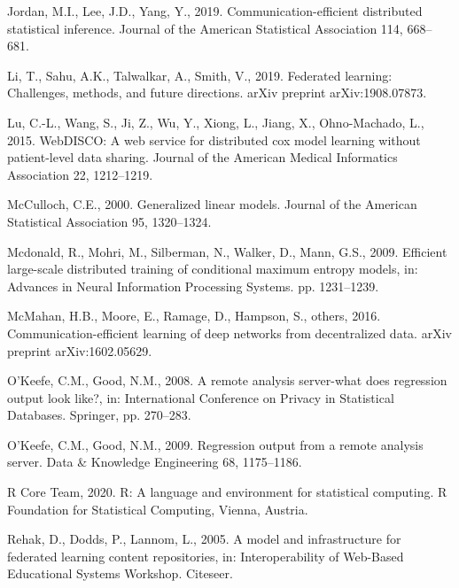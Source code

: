 \documentclass[]{elsarticle} %
\newlength{\cslhangindent}
\newenvironment{cslreferences}%
  {\setlength{\parindent}{0pt}%
  \everypar{\setlength{\hangindent}{\cslhangindent}}\ignorespaces}%
  {\par}
\begin{document}
\begin{cslreferences}
\leavevmode\hypertarget{ref-jordan2019communication}{}%
Jordan, M.I., Lee, J.D., Yang, Y., 2019. Communication-efficient distributed statistical inference. Journal of the American Statistical Association 114, 668--681.

\leavevmode\hypertarget{ref-li2019federated}{}%
Li, T., Sahu, A.K., Talwalkar, A., Smith, V., 2019. Federated learning: Challenges, methods, and future directions. arXiv preprint arXiv:1908.07873.

\leavevmode\hypertarget{ref-lu2015webdisco}{}%
Lu, C.-L., Wang, S., Ji, Z., Wu, Y., Xiong, L., Jiang, X., Ohno-Machado, L., 2015. WebDISCO: A web service for distributed cox model learning without patient-level data sharing. Journal of the American Medical Informatics Association 22, 1212--1219.

\leavevmode\hypertarget{ref-mcculloch2000generalized}{}%
McCulloch, C.E., 2000. Generalized linear models. Journal of the American Statistical Association 95, 1320--1324.

\leavevmode\hypertarget{ref-mcdonald2009efficient}{}%
Mcdonald, R., Mohri, M., Silberman, N., Walker, D., Mann, G.S., 2009. Efficient large-scale distributed training of conditional maximum entropy models, in: Advances in Neural Information Processing Systems. pp. 1231--1239.

\leavevmode\hypertarget{ref-mcmahan2016communication}{}%
McMahan, H.B., Moore, E., Ramage, D., Hampson, S., others, 2016. Communication-efficient learning of deep networks from decentralized data. arXiv preprint arXiv:1602.05629.

\leavevmode\hypertarget{ref-o2008remote}{}%
O'Keefe, C.M., Good, N.M., 2008. A remote analysis server-what does regression output look like?, in: International Conference on Privacy in Statistical Databases. Springer, pp. 270--283.

\leavevmode\hypertarget{ref-o2009regression}{}%
O'Keefe, C.M., Good, N.M., 2009. Regression output from a remote analysis server. Data \& Knowledge Engineering 68, 1175--1186.

\leavevmode\hypertarget{ref-RCORE}{}%
R Core Team, 2020. R: A language and environment for statistical computing. R Foundation for Statistical Computing, Vienna, Austria.

\leavevmode\hypertarget{ref-corda}{}%
Rehak, D., Dodds, P., Lannom, L., 2005. A model and infrastructure for federated learning content repositories, in: Interoperability of Web-Based Educational Systems Workshop. Citeseer.


\end{cslreferences}
\end{document}
